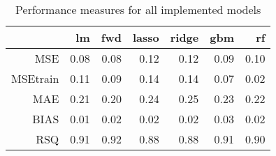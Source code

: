 \begin{table}[ht]
\centering
\begin{tabular}{rrrrrrr}
  \hline
 & lm & fwd & lasso & ridge & gbm & rf \\ 
  \hline
MSE & 0.08 & 0.08 & 0.12 & 0.12 & 0.09 & 0.10 \\ 
  MSEtrain & 0.11 & 0.09 & 0.14 & 0.14 & 0.07 & 0.02 \\ 
  MAE & 0.21 & 0.20 & 0.24 & 0.25 & 0.23 & 0.22 \\ 
  BIAS & 0.01 & 0.02 & 0.02 & 0.02 & 0.03 & 0.02 \\ 
  RSQ & 0.91 & 0.92 & 0.88 & 0.88 & 0.91 & 0.90 \\ 
   \hline
\end{tabular}
\caption{Performance measures for all implemented models}
\label{tab:measures}
\end{table}

